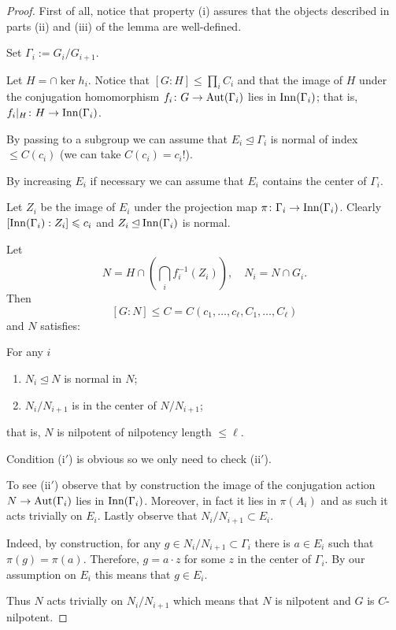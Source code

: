 \documentclass{amsart}
\begin{document}
\begin{proof}
First of all, notice that
property (i) assures that the
objects described in parts (ii) and (iii) of the lemma are well-defined.

Set $\Gamma_i:=G_i/G_{i+1}$.

Let $H=\cap\ker{h_i}$.
Notice that $[G{:}H]\le \prod_iC_i$ and that the image of $H$ under the conjugation homomorphism $f_i\colon  G\to \operatorname{\rm Aut}(\Gamma_i)$  lies in $\operatorname{\rm Inn}(\Gamma_i)$;
that is,  $f_i|_H\colon H\z\to\Inn(\Gamma_i)$.

By passing to a subgroup we can assume that $E_i\unlhd \Gamma_i$ is normal of index $\le C(c_i)$ (we can take $C(c_i)=c_i!$).

By increasing $E_i$ if necessary we can assume that $E_i$ contains the center of $\Gamma_i$.

Let $Z_i$ be the image of $E_i$ under the projection map $\pi\colon \Gamma_i\to \operatorname{\rm Inn}(\Gamma_i)$.
Clearly $[ \operatorname{\rm Inn}(\Gamma_i): Z_i]\leqslant c_i$ and $Z_i\unlhd  \operatorname{\rm Inn}(\Gamma_i)$ is normal.


Let
$$N=H\cap\left(\bigcap_if_i^{-1}(Z_i)\right),\quad N_i=N\cap G_i.$$
Then
$$[G:N]\le C=C(c_1,\ldots, c_\ell, C_1,\ldots, C_\ell)$$
and $N$ satisfies:


For any $i$
\begin{enumerate}[(i$'$)]
\item$N_i \unlhd N$ is normal in $N$;

\item $N_i/N_{i+1}$ is in the center of $N/N_{i+1}$;
\end{enumerate}
 that is, $N$ is nilpotent of nilpotency length $\le \ell$.

 Condition (i$'$) is obvious so we only need to check (ii$'$).

 To see (ii$'$) observe that by construction the image of the conjugation action $N\to \operatorname{\rm Aut}(\Gamma_i)$ lies in $\operatorname{\rm Inn}(\Gamma_i)$. Moreover, in fact it lies in $\pi(A_i)$ and as such it acts trivially on $E_i$. Lastly observe that  $N_i/N_{i+1}\subset E_i$.

 Indeed, by construction, for any $g\in N_i/N_{i+1}\subset \Gamma_i$ there is $a\in E_i$ such that $\pi(g)=\pi(a)$. Therefore, $g=a{\cdot} z$ for some $z$ in the center of $\Gamma_i$. By our assumption on $E_i$ this means that $g\in E_i$.

 Thus $N$ acts trivially on $N_i/N_{i+1}$ which means that $N$ is nilpotent and $G$ is $C$-nilpotent.
 \end{proof}
\end{document}
